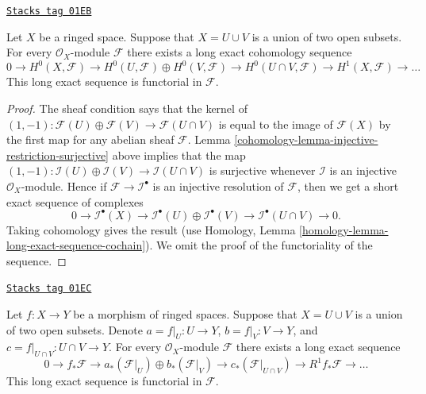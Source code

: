 \begin{lemma}

\label{cohomology-lemma-mayer-vietoris}
\href{https://stacks.math.columbia.edu/tag/01EB}{\texttt{Stacks tag 01EB}}

Let $X$ be a ringed space. Suppose that $X = U \cup V$ is a
union of two open subsets. For every $\mathcal{O}_X$-module $\mathcal{F}$
there exists a long exact cohomology sequence
$$
0 \to
H^0(X, \mathcal{F}) \to
H^0(U, \mathcal{F}) \oplus H^0(V, \mathcal{F}) \to
H^0(U \cap V, \mathcal{F}) \to
H^1(X, \mathcal{F}) \to \ldots
$$
This long exact sequence is functorial in $\mathcal{F}$.
\end{lemma}

\begin{proof}

The sheaf condition says that the kernel of
$(1, -1) : \mathcal{F}(U) \oplus \mathcal{F}(V) \to \mathcal{F}(U \cap V)$
is equal to the image of $\mathcal{F}(X)$ by the first map
for any abelian sheaf $\mathcal{F}$.
Lemma \ref{cohomology-lemma-injective-restriction-surjective} above implies that the map
$(1, -1) : \mathcal{I}(U) \oplus \mathcal{I}(V) \to \mathcal{I}(U \cap V)$
is surjective whenever $\mathcal{I}$ is an injective $\mathcal{O}_X$-module.
Hence if $\mathcal{F} \to \mathcal{I}^\bullet$ is an injective resolution
of $\mathcal{F}$, then we get a short exact sequence of complexes
$$
0 \to
\mathcal{I}^\bullet(X) \to
\mathcal{I}^\bullet(U) \oplus \mathcal{I}^\bullet(V) \to
\mathcal{I}^\bullet(U \cap V) \to
0.
$$
Taking cohomology gives the result (use
Homology, Lemma \ref{homology-lemma-long-exact-sequence-cochain}).
We omit the proof of the functoriality of the sequence.
\end{proof}

\begin{lemma}

\label{cohomology-lemma-relative-mayer-vietoris}
\href{https://stacks.math.columbia.edu/tag/01EC}{\texttt{Stacks tag 01EC}}

Let $f : X \to Y$ be a morphism of ringed spaces.
Suppose that $X = U \cup V$ is a union of two open subsets.
Denote $a = f|_U : U \to Y$, $b = f|_V : V \to Y$, and
$c = f|_{U \cap V} : U \cap V \to Y$.
For every $\mathcal{O}_X$-module $\mathcal{F}$
there exists a long exact sequence
$$
0 \to
f_*\mathcal{F} \to
a_*(\mathcal{F}|_U) \oplus b_*(\mathcal{F}|_V) \to
c_*(\mathcal{F}|_{U \cap V}) \to
R^1f_*\mathcal{F} \to \ldots
$$
This long exact sequence is functorial in $\mathcal{F}$.
\end{lemma}

